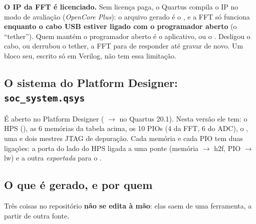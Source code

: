 \documentclass[11pt,a4paper,oneside]{article}
\begin{document}
\begin{cuidado}
\textbf{O IP da FFT é licenciado.} Sem licença paga, o Quartus compila o IP
no modo de avaliação (\emph{OpenCore Plus}): o arquivo gerado é o
, e a FFT só funciona \textbf{enquanto o
cabo USB estiver ligado com o programador aberto} (o ``tether''). Quem mantém
o programador aberto é o aplicativo, ou o . Desligou o
cabo, ou derrubou o tether, a FFT para de responder até gravar de novo. Um
bloco seu, escrito só em Verilog, não tem essa limitação.
\end{cuidado}

\subsection{O sistema do Platform Designer: \texttt{soc\_system.qsys}}

É aberto no Platform Designer ( \(\to\)  no
Quartus 20.1). Nesta versão ele tem: o HPS (), as 6 memórias da
tabela acima, os 10 PIOs (4 da FFT, 6 do ADC), o , uma
 e dois mestres JTAG de depuração. Cada memória e cada PIO tem
duas ligações: a porta do lado do HPS ligada a uma ponte (memória \(\to\) h2f,
PIO \(\to\) lw) e a outra \emph{exportada} para o .

\subsection{O que é gerado, e por quem}\label{sec:gerados}

Três coisas no repositório \textbf{não se edita à mão}: elas saem de uma
ferramenta, a partir de outra fonte.

\begin{center}
\end{center}
\end{document}
